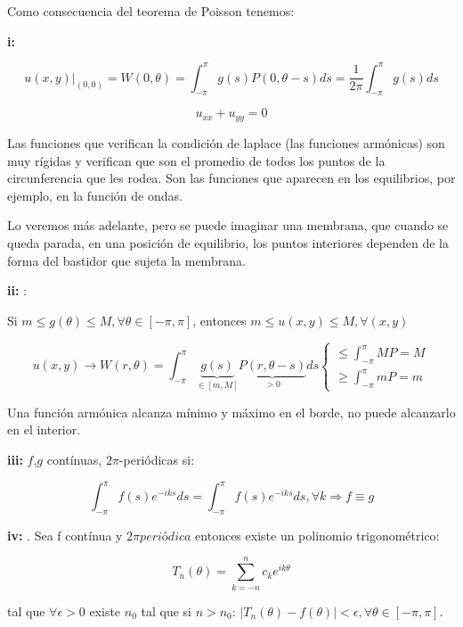 		Como consecuencia del teorema de Poisson tenemos:

		\textbf{i:} 

		 \[u(x,y)|_{(0,0)}  = W(0,\theta) = \int_{-\pi}^\pi g(s) P(0, \theta - s) ds = \frac{1}{2\pi} \int_{-\pi}^\pi g(s) ds \]

		 \[ u_{xx} + u_{yy} = 0\]

		 Las funciones que verifican la condición de laplace (las funciones armónicas) son muy rígidas y verifican que son el promedio de todos los puntos de la circunferencia que les rodea. Son las funciones que aparecen en los equilibrios, por ejemplo, en la función de ondas.

		Lo veremos más adelante, pero se puede imaginar una membrana, que cuando se queda parada, en una posición de equilibrio, los puntos interiores dependen de la forma del bastidor que sujeta la membrana.

		\textbf{ii:} :

		Si $m \leq g(\theta) \leq M, \forall \theta \in [-\pi,\pi]$, entonces $m \leq u(x,y) \leq M, \forall (x,y)$

		\[u(x,y) \rightarrow W(r,\theta) = \int_{-\pi}^{\pi} \underbrace{g(s)}_{\in [m,M]} \underbrace{P(r,\theta-s)}_{> 0} ds \begin{cases}
			\leq \int_{-\pi}^{\pi} MP = M \\
			\geq \int_{-\pi}^{\pi} mP = m

		\end{cases} \]

		Una función armónica alcanza mínimo y máximo en el borde, no puede alcanzarlo en el interior.

		\textbf{iii:} $f$,$g$ contínuas, $2\pi$-periódicas si:

		\[ \int_{-\pi}^{\pi} f(s) e^{-iks}ds =
		 \int_{-\pi}^{\pi} f(s) e^{-iks}ds,  \forall k \Rightarrow f \equiv g \]

		\textbf{iv:} . Sea f contínua y $2\pi periódica$ entonces existe un polinomio trigonométrico:

		\[T_n (\theta) = \sum_{k = -n}^n c_k e^{ik\theta} \]

		tal que $\forall \epsilon > 0$ existe $n_0$ tal que si $n > n_0$: $|T_n (\theta) - f(\theta)| < \epsilon, \forall \theta \in [-\pi,\pi]$.

